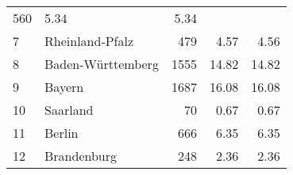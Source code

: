 \begin{longtable}{lXrrr}
       \num{560} &
       \num[round-mode=places,round-precision=2]{5,34} &
         \num[round-mode=places,round-precision=2]{5,34} \\

     7 &
     \multicolumn{1}{X}{ Rheinland-Pfalz   } &


       \num{479} &
       \num[round-mode=places,round-precision=2]{4,57} &
         \num[round-mode=places,round-precision=2]{4,56} \\

     8 &
     \multicolumn{1}{X}{ Baden-Württemberg   } &


       \num{1555} &
       \num[round-mode=places,round-precision=2]{14,82} &
         \num[round-mode=places,round-precision=2]{14,82} \\

     9 &
     \multicolumn{1}{X}{ Bayern   } &


       \num{1687} &
       \num[round-mode=places,round-precision=2]{16,08} &
         \num[round-mode=places,round-precision=2]{16,08} \\

     10 &
     \multicolumn{1}{X}{ Saarland   } &


       \num{70} &
       \num[round-mode=places,round-precision=2]{0,67} &
         \num[round-mode=places,round-precision=2]{0,67} \\

     11 &
     \multicolumn{1}{X}{ Berlin   } &


       \num{666} &
       \num[round-mode=places,round-precision=2]{6,35} &
         \num[round-mode=places,round-precision=2]{6,35} \\

     12 &
     \multicolumn{1}{X}{ Brandenburg   } &


       \num{248} &
       \num[round-mode=places,round-precision=2]{2,36} &
         \num[round-mode=places,round-precision=2]{2,36} \\


\end{longtable}
